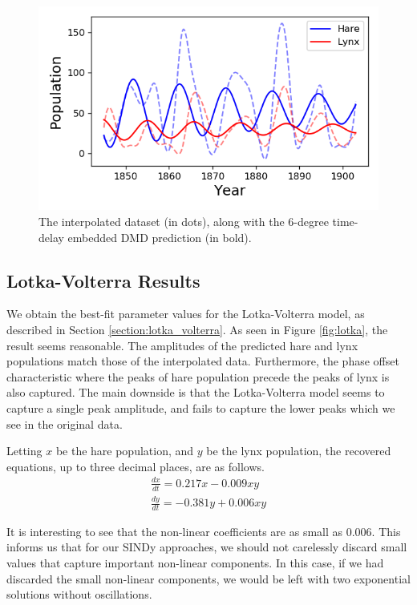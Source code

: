 \documentclass[letterpaper, 10 pt, conference]{ieeeconf}  %
\begin{document}
\begin{figure}[htb] 
\centering
\includegraphics[width=0.97\columnwidth]{images/dmd_time_delay.png}
\caption{The interpolated dataset (in dots), along with the 6-degree time-delay embedded DMD prediction (in bold).}
\label{fig:time_delayed_dmd}
\end{figure}

\subsection{Lotka-Volterra Results}
We obtain the best-fit parameter values for the Lotka-Volterra model, as described in Section \ref{section:lotka_volterra}. As seen in Figure \ref{fig:lotka}, the result seems reasonable. The amplitudes of the predicted hare and lynx populations match those of the interpolated data. Furthermore, the phase offset characteristic where the peaks of hare population precede the peaks of lynx is also captured. The main downside is that the Lotka-Volterra model seems to capture a single peak amplitude, and fails to capture the lower peaks which we see in the original data.

Letting $x$ be the hare population, and $y$ be the lynx population, the recovered equations, up to three decimal places, are as follows.
\begin{equation}
\begin{split}
\frac{dx}{dt} = 0.217 x -0.009 xy \\
\frac{dy}{dt} = -0.381 y + 0.006 xy
\end{split}
\end{equation}

It is interesting to see that the non-linear coefficients are as small as 0.006. This informs us that for our SINDy approaches, we should not carelessly discard small values that capture important non-linear components. In this case, if we had discarded the small non-linear components, we would be left with two exponential solutions without oscillations.
\end{document}
